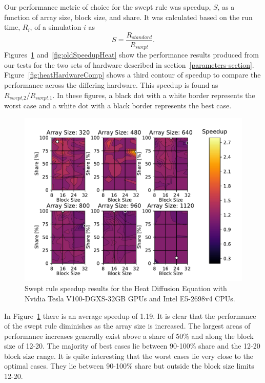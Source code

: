 \documentclass[preprints,article,accept,moreauthors,pdftex]{Definitions/mdpi}
\newcommand\fs{0.7}
\def\newCPU{Intel E5-2698v4} %
\def\newGPU{Nvidia Tesla V100-DGXS-32GB}
\begin{document}
Our performance metric of choice for the swept rule was speedup, $S$, as a function of array size, block size, and share. It was calculated based on the run time, $R_i$, of a simulation $i$ as
\begin{equation}
    S = \frac{R_{\textit{standard}}}{R_{\textit{swept}}}.
\end{equation}
Figures~\ref{fig:newSpeedupHeat} and~\ref{fig:oldSpeedupHeat} show the performance results produced from our tests for the two sets of hardware described in section~\ref{parameters-section}. 
Figure~\ref{fig:heatHardwareComp} shows a third contour of speedup to compare the performance across the differing hardware. This speedup is found as $R_{\textit{swept,2}}/R_{\textit{swept,1}}$. In these figures, a black dot with a white border represents the worst case and a white dot with a black border represents the best case.

\begin{figure}[H]
    
    \begin{center}
        \includegraphics[scale=\fs, trim={0.75cm 0.4cm 0.8cm 0.7cm},clip]{figs/speedUpheatNew.pdf}
        \caption{Swept rule speedup results for the Heat Diffusion Equation with \newGPU{} GPUs and \newCPU{} CPUs.}
        \label{fig:newSpeedupHeat}
    \end{center}
\end{figure}




In Figure~\ref{fig:newSpeedupHeat} there is an average speedup of 1.19. It is clear that the performance of the swept rule diminishes as the array size is increased. The largest areas of performance increases generally exist above a share of 50\% and along the block size of 12-20. The majority of best cases lie between 90-100\% share and the 12-20 block size range. It is quite interesting that the worst cases lie very close to the optimal cases. They lie between 90-100\% share but outside the block size limits 12-20.
\end{document}
